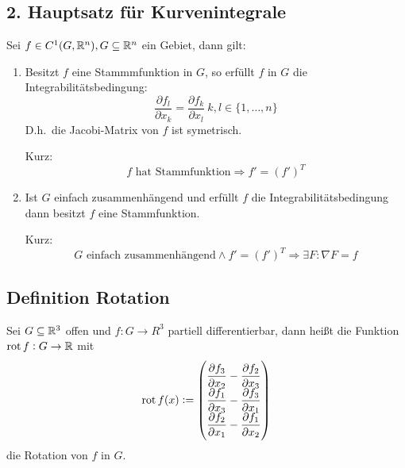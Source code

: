 \subsection{2. Hauptsatz für Kurvenintegrale}
Sei $f \in C^1(G, \mathbb{R}^n), G \subseteq \mathbb{R}^n$ ein Gebiet, dann gilt:
\begin{enumerate}[label= (\alph*)]
    \item Besitzt $f$ eine Stammmfunktion in $G$, so erfüllt $f$ in $G$ die
        Integrabilitätsbedingung:
        \begin{equation*}
            \frac{\partial f_l}{\partial x_k} = \frac{\partial f_k}{\partial x_l}\
            k,l \in \{ 1, \ldots, n\}
        \end{equation*}
        D.h.\ die Jacobi-Matrix von $f$ ist symetrisch.

        Kurz:
        \begin{equation*}
            f \text{ hat Stammfunktion} \Rightarrow f' = (f')^T
        \end{equation*}
    \item Ist $G$ einfach zusammenhängend und erfüllt $f$ die Integrabilitätsbedingung
        dann besitzt $f$ eine Stammfunktion.

        Kurz:
        \begin{equation*}
            G \text{ einfach zusammenhängend} \land f' = (f')^T \Rightarrow
                \exists F: \nabla F = f
        \end{equation*}
\end{enumerate}

\subsection{Definition Rotation}
Sei $G \subseteq \mathbb{R}^3$ offen und $f: G \rightarrow R^3$ partiell differentierbar,
dann heißt die Funktion $\operatorname{rot} f: G \rightarrow \mathbb{R}$ mit
\begin{equation*}
    \operatorname{rot} f(x) :=
    \begin{pmatrix}
        \dfrac{\partial f_3}{\partial x_2} - \dfrac{\partial f_2}{\partial x_3} \\
        \dfrac{\partial f_1}{\partial x_3} - \dfrac{\partial f_3}{\partial x_1} \\
        \dfrac{\partial f_2}{\partial x_1} - \dfrac{\partial f_1}{\partial x_2} \\
    \end{pmatrix}
\end{equation*}
die Rotation von $f$ in $G$.

